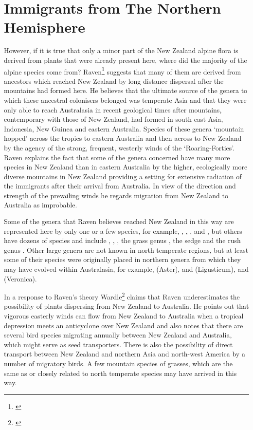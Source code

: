 \section{Immigrants from The Northern Hemisphere}

However, if it is true that only a minor part of the New Zealand alpine flora is derived from plants that were already present here, where did the majority of the alpine species come from? Raven\footnote{\cite{raven1973evolution}} suggests that many of them are derived from ancestors which reached New Zealand by long distance dispersal after the mountains had formed here.
He believes that the ultimate source of the genera to which these ancestral colonisers belonged was temperate Asia and that they were only able to reach Australasia in recent geological times after mountains, contemporary with those of New Zealand, had formed in south east Asia, Indonesia, New Guinea and eastern Australia.
Species of these genera `mountain hopped' across the tropics to eastern Australia and then across to New Zealand by the agency of the strong, frequent, westerly winds of the `Roaring-Forties'.
Raven explains the fact that some of the genera concerned have many more species in New Zealand than in eastern Australia by the higher, ecologically more diverse mountains in New Zealand providing a setting for extensive radiation of the immigrants after their arrival from Australia.
In view of the direction and strength of the prevailing winds he regards migration from New Zealand to Australia as improbable.

Some of the genera that Raven believes reached New Zealand in this way are represented here by only one or a few species, for example, , , ,  and , but others have dozens of species and include , , , the grass genus , the sedge  and the rush genus .
Other large genera are not known in north temperate regions, but at least some of their species were originally placed in northern genera from which they may have evolved within Australasia, for example,  (Aster),  and  (Ligusticum), and  (Veronica).

In a response to Raven's theory Wardle\footnote{\cite{wardle1978origin}} claims that Raven underestimates the possibility of plants dispersing from New Zealand to Australia.
He points out that vigorous easterly winds can flow from New Zealand to Australia when a tropical depression meets an anticyclone over New Zealand and also notes that there are several bird species migrating annually between New Zealand and Australia, which might serve as seed transporters.
There is also the possibility of direct transport between New Zealand and northern Asia and north-west America by a number of migratory birds.
A few mountain species of grasses, which are the same as or closely related to north temperate species may have arrived in this way.

